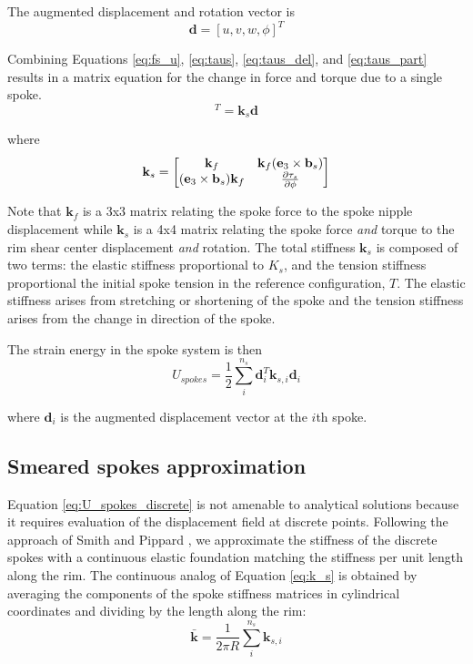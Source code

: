 \documentclass[\rootdir/thesis.tex]{subfiles}
\begin{document}
The augmented displacement and rotation vector is
\begin{equation}
\mathbf{d} = [u, v, w, \phi]^T
\end{equation}

Combining Equations \eqref{eq:fs_u}, \eqref{eq:taus}, \eqref{eq:taus_del}, and \eqref{eq:taus_part} results in a matrix equation for the change in force and torque due to a single spoke.
\begin{equation}
[\Delta f_{s1}, \Delta f_{s1}, \Delta f_{s3}, \Delta\tau_s]^T = \mathbf{k}_s \mathbf{d}
\end{equation}

where
\begin{equation}
\label{eq:k_s}
\mathbf{k}_s =
\begin{bmatrix}
\mathbf{k}_f                    & \mathbf{k}_f (\mathbf{e}_3\times\mathbf{b}_s)\\
(\mathbf{e}_3\times\mathbf{b}_s) \mathbf{k}_f & \frac{\partial\tau_s}{\partial\phi}
\end{bmatrix}
\end{equation}

Note that $\mathbf{k}_f$ is a 3x3 matrix relating the spoke force to the spoke nipple displacement while $\mathbf{k}_s$ is a 4x4 matrix relating the spoke force \emph{and} torque to the rim shear center displacement \emph{and} rotation. The total stiffness $\mathbf{k}_s$ is composed of two terms: the elastic stiffness proportional to $K_s$, and the tension stiffness proportional the initial spoke tension in the reference configuration, $T$. The elastic stiffness arises from stretching or shortening of the spoke and the tension stiffness arises from the change in direction of the spoke.

The strain energy in the spoke system is then
\begin{equation}
\label{eq:U_spokes_discrete}
U_{spokes} = \frac{1}{2} \sum_i^{n_s} \mathbf{d}_i^T \mathbf{k}_{s,i} \mathbf{d}_i
\end{equation}

where $\mathbf{d}_i$ is the augmented displacement vector at the $i$th spoke.

\subsection{Smeared spokes approximation}
Equation \ref{eq:U_spokes_discrete} is not amenable to analytical solutions because it requires evaluation of the displacement field at discrete points. Following the approach of Smith \cite{Smith1901} and Pippard \cite{Pippard1931}, we approximate the stiffness of the discrete spokes with a continuous elastic foundation matching the stiffness per unit length along the rim. The continuous analog of Equation \eqref{eq:k_s} is obtained by averaging the components of the spoke stiffness matrices in cylindrical coordinates and dividing by the length along the rim:
\begin{equation}
\label{eq:k_bar}
\mathbf{\bar{k}} = \frac{1}{2\pi R} \sum_i^{n_s} \mathbf{k}_{s,i}
\end{equation}
\end{document}
